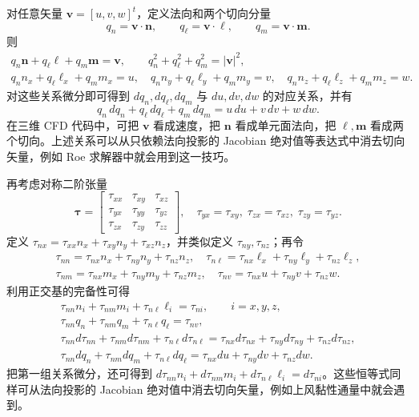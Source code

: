 \documentclass[11pt,a4paper,openany,fontset=none]{ctexbook}
\begin{document}
对任意矢量 $\bm v=[u,v,w]^t$，定义法向和两个切向分量
\begin{equation}
 q_n=\bm v\cdot\bm n,\qquad q_\ell=\bm v\cdot\bm\ell,\qquad q_m=\bm v\cdot\bm m. \tag{1.3.20}
\end{equation}
则
\begin{gather}
 q_n\bm n+q_\ell\bm\ell+q_m\bm m=\bm v,\qquad
 q_n^2+q_\ell^2+q_m^2=|\bm v|^2, \tag{1.3.21--22}\\
 q_nn_x+q_\ell\ell_x+q_mm_x=u,\quad
 q_nn_y+q_\ell\ell_y+q_mm_y=v,\quad
 q_nn_z+q_\ell\ell_z+q_mm_z=w. \tag{1.3.23--25}
\end{gather}
对这些关系微分即可得到 $dq_n,dq_\ell,dq_m$ 与 $du,dv,dw$ 的对应关系，并有
\begin{equation}
 q_n\,dq_n+q_\ell\,dq_\ell+q_m\,dq_m=u\,du+v\,dv+w\,dw. \tag{1.3.29}
\end{equation}
在三维 CFD 代码中，可把 $\bm v$ 看成速度，把 $\bm n$ 看成单元面法向，把 $\bm\ell,\bm m$ 看成两个切向。上述关系可以从只依赖法向投影的 Jacobian 绝对值等表达式中消去切向矢量，例如 Roe 求解器中就会用到这一技巧。

再考虑对称二阶张量
\begin{equation}
 \bm\tau=\begin{bmatrix}\tau_{xx}&\tau_{xy}&\tau_{xz}\\\tau_{yx}&\tau_{yy}&\tau_{yz}\\\tau_{zx}&\tau_{zy}&\tau_{zz}\end{bmatrix},
 \quad \tau_{yx}=\tau_{xy},\;\tau_{zx}=\tau_{xz},\;\tau_{zy}=\tau_{yz}. \tag{1.3.30}
\end{equation}
定义 $\tau_{nx}=\tau_{xx}n_x+\tau_{xy}n_y+\tau_{xz}n_z$，并类似定义 $\tau_{ny},\tau_{nz}$；再令
\begin{gather}
 \tau_{nn}=\tau_{nx}n_x+\tau_{ny}n_y+\tau_{nz}n_z,\quad
 \tau_{n\ell}=\tau_{nx}\ell_x+\tau_{ny}\ell_y+\tau_{nz}\ell_z,\\
 \tau_{nm}=\tau_{nx}m_x+\tau_{ny}m_y+\tau_{nz}m_z,\quad
 \tau_{nv}=\tau_{nx}u+\tau_{ny}v+\tau_{nz}w. \tag{1.3.31--37}
\end{gather}
利用正交基的完备性可得
\begin{gather}
 \tau_{nn}n_i+\tau_{nm}m_i+\tau_{n\ell}\ell_i=\tau_{ni},\qquad i=x,y,z, \tag{1.3.38--40}\\
 \tau_{nn}q_n+\tau_{nm}q_m+\tau_{n\ell}q_\ell=\tau_{nv}, \tag{1.3.41}\\
 \tau_{nn}d\tau_{nn}+\tau_{nm}d\tau_{nm}+\tau_{n\ell}d\tau_{n\ell}
 =\tau_{nx}d\tau_{nx}+\tau_{ny}d\tau_{ny}+\tau_{nz}d\tau_{nz}, \tag{1.3.42}\\
 \tau_{nn}dq_n+\tau_{nm}dq_m+\tau_{n\ell}dq_\ell
 =\tau_{nx}du+\tau_{ny}dv+\tau_{nz}dw. \tag{1.3.43}
\end{gather}
把第一组关系微分，还可得到 $d\tau_{nn}n_i+d\tau_{nm}m_i+d\tau_{n\ell}\ell_i=d\tau_{ni}$。这些恒等式同样可从法向投影的 Jacobian 绝对值中消去切向矢量，例如上风黏性通量中就会遇到。
\end{document}
